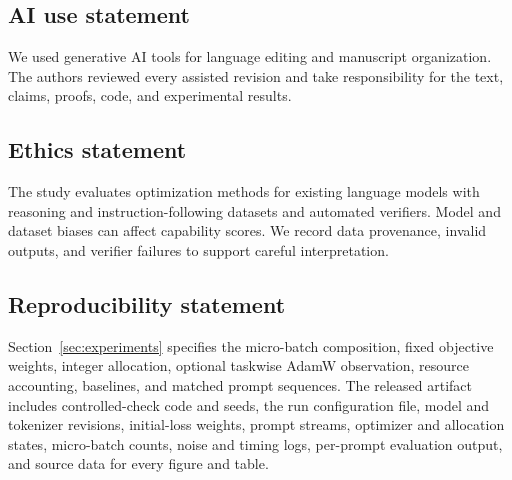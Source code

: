 \subsection*{AI use statement}

We used generative AI tools for language editing and manuscript organization.
The authors reviewed every assisted revision and take responsibility for the
text, claims, proofs, code, and experimental results.

\subsection*{Ethics statement}

The study evaluates optimization methods for existing language models with
reasoning and instruction-following datasets and automated verifiers. Model and
dataset biases can affect capability scores. We record data provenance, invalid
outputs, and verifier failures to support careful interpretation.

\subsection*{Reproducibility statement}

Section~\ref{sec:experiments} specifies the micro-batch composition, fixed
objective weights, integer allocation, optional taskwise AdamW observation,
resource accounting, baselines, and matched prompt sequences. The released
artifact includes controlled-check code and seeds, the run configuration file,
model and tokenizer
revisions, initial-loss weights, prompt streams, optimizer and allocation
states, micro-batch counts, noise and timing logs, per-prompt evaluation output,
and source data for every figure and table.
